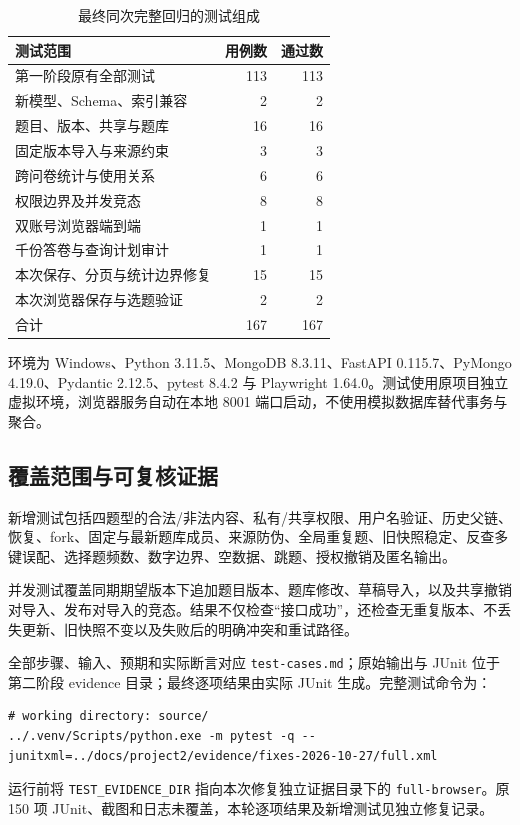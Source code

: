 \documentclass[UTF8,10pt,a4paper,twocolumn,fontset=none]{ctexart}
\begin{document}
\begin{table}[t]
\centering\small
\caption{最终同次完整回归的测试组成}
\label{tab:tests}
\begin{tabularx}{\columnwidth}{@{}Yrr@{}}
\toprule 测试范围 & 用例数 & 通过数\\\midrule
第一阶段原有全部测试 & 113 & 113\\
新模型、Schema、索引兼容 & 2 & 2\\
题目、版本、共享与题库 & 16 & 16\\
固定版本导入与来源约束 & 3 & 3\\
跨问卷统计与使用关系 & 6 & 6\\
权限边界及并发竞态 & 8 & 8\\
双账号浏览器端到端 & 1 & 1\\
千份答卷与查询计划审计 & 1 & 1\\\midrule
本次保存、分页与统计边界修复 & 15 & 15\\
本次浏览器保存与选题验证 & 2 & 2\\\midrule
合计 & 167 & 167\\\bottomrule
\end{tabularx}
\end{table}

环境为 Windows、Python 3.11.5、MongoDB 8.3.11、FastAPI 0.115.7、PyMongo 4.19.0、Pydantic 2.12.5、pytest 8.4.2 与 Playwright 1.64.0。测试使用原项目独立虚拟环境，浏览器服务自动在本地 8001 端口启动，不使用模拟数据库替代事务与聚合。

\subsection{覆盖范围与可复核证据}
新增测试包括四题型的合法/非法内容、私有/共享权限、用户名验证、历史父链、恢复、fork、固定与最新题库成员、来源防伪、全局重复题、旧快照稳定、反查多键误配、选择题频数、数字边界、空数据、跳题、授权撤销及匿名输出。

并发测试覆盖同期期望版本下追加题目版本、题库修改、草稿导入，以及共享撤销对导入、发布对导入的竞态。结果不仅检查“接口成功”，还检查无重复版本、不丢失更新、旧快照不变以及失败后的明确冲突和重试路径。

全部步骤、输入、预期和实际断言对应 \texttt{test-cases.md}；原始输出与 JUnit 位于第二阶段 evidence 目录；最终逐项结果由实际 JUnit 生成。完整测试命令为：
\begin{lstlisting}
# working directory: source/
../.venv/Scripts/python.exe -m pytest -q --junitxml=../docs/project2/evidence/fixes-2026-10-27/full.xml
\end{lstlisting}
运行前将 \texttt{TEST\_EVIDENCE\_DIR} 指向本次修复独立证据目录下的 \texttt{full-browser}。原 150 项 JUnit、截图和日志未覆盖，本轮逐项结果及新增测试见独立修复记录。
\end{document}
